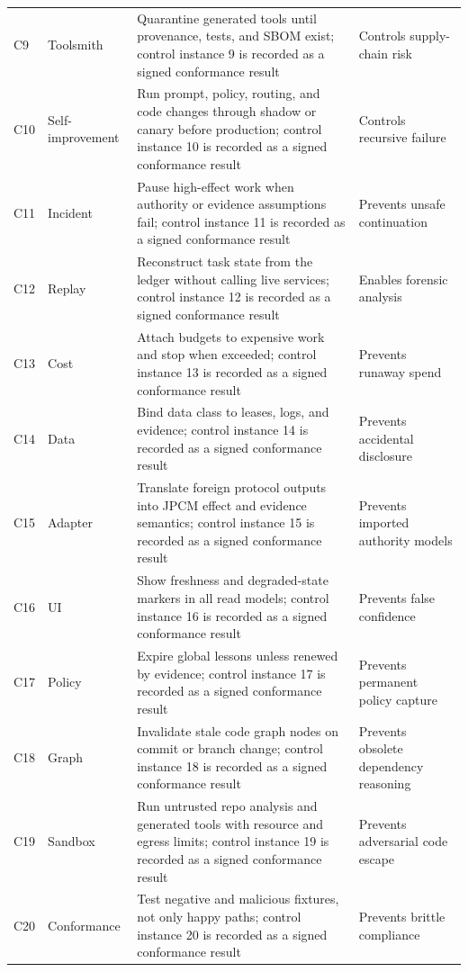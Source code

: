 \documentclass[10pt,journal,onecolumn]{IEEEtran}
\begin{document}
\begin{longtable}{P{0.06\textwidth} P{0.14\textwidth} P{0.48\textwidth} P{0.24\textwidth}}
C9 & Toolsmith & Quarantine generated tools until provenance, tests, and SBOM exist; control instance 9 is recorded as a signed conformance result & Controls supply-chain risk \\
C10 & Self-improvement & Run prompt, policy, routing, and code changes through shadow or canary before production; control instance 10 is recorded as a signed conformance result & Controls recursive failure \\
C11 & Incident & Pause high-effect work when authority or evidence assumptions fail; control instance 11 is recorded as a signed conformance result & Prevents unsafe continuation \\
C12 & Replay & Reconstruct task state from the ledger without calling live services; control instance 12 is recorded as a signed conformance result & Enables forensic analysis \\
C13 & Cost & Attach budgets to expensive work and stop when exceeded; control instance 13 is recorded as a signed conformance result & Prevents runaway spend \\
C14 & Data & Bind data class to leases, logs, and evidence; control instance 14 is recorded as a signed conformance result & Prevents accidental disclosure \\
C15 & Adapter & Translate foreign protocol outputs into JPCM effect and evidence semantics; control instance 15 is recorded as a signed conformance result & Prevents imported authority models \\
C16 & UI & Show freshness and degraded-state markers in all read models; control instance 16 is recorded as a signed conformance result & Prevents false confidence \\
C17 & Policy & Expire global lessons unless renewed by evidence; control instance 17 is recorded as a signed conformance result & Prevents permanent policy capture \\
C18 & Graph & Invalidate stale code graph nodes on commit or branch change; control instance 18 is recorded as a signed conformance result & Prevents obsolete dependency reasoning \\
C19 & Sandbox & Run untrusted repo analysis and generated tools with resource and egress limits; control instance 19 is recorded as a signed conformance result & Prevents adversarial code escape \\
C20 & Conformance & Test negative and malicious fixtures, not only happy paths; control instance 20 is recorded as a signed conformance result & Prevents brittle compliance \\

\end{longtable}
\end{document}
